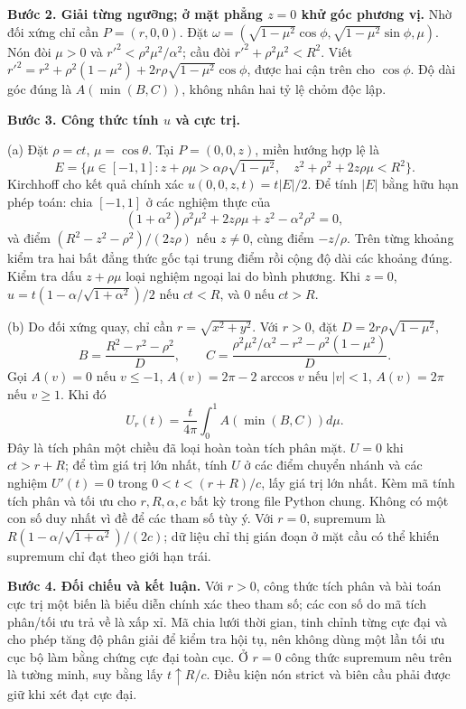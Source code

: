 \textbf{Bước 2. Giải từng ngưỡng; ở mặt phẳng $z=0$ khử góc phương vị.} Nhờ đối xứng chỉ cần $P=(r,0,0)$. Đặt $\omega=(\sqrt{1-\mu^2}\cos\phi,\sqrt{1-\mu^2}\sin\phi,\mu)$. Nón đòi $\mu>0$ và $r'^2<\rho^2\mu^2/\alpha^2$; cầu đòi $r'^2+\rho^2\mu^2<R^2$. Viết $r'^2=r^2+\rho^2(1-\mu^2)+2r\rho\sqrt{1-\mu^2}\cos\phi$, được hai cận trên cho $\cos\phi$. Độ dài góc đúng là $A(\min(B,C))$, không nhân hai tỷ lệ chỏm độc lập.

\textbf{Bước 3. Công thức tính $u$ và cực trị.}

(a) Đặt $\rho=ct$, $\mu=\cos\theta$. Tại $P=(0,0,z)$, miền hướng hợp lệ là
\[E=\{\mu\in[-1,1]:z+\rho\mu>\alpha\rho\sqrt{1-\mu^2},\quad z^2+\rho^2+2z\rho\mu<R^2\}.\]
Kirchhoff cho kết quả chính xác $u(0,0,z,t)=t|E|/2$. Để tính $|E|$ bằng hữu hạn phép toán: chia $[-1,1]$ ở các nghiệm thực của
\[(1+\alpha^2)\rho^2\mu^2+2z\rho\mu+z^2-\alpha^2\rho^2=0,\]
và điểm $(R^2-z^2-\rho^2)/(2z\rho)$ nếu $z\ne0$, cùng điểm $-z/\rho$. Trên từng khoảng kiểm tra hai bất đẳng thức gốc tại trung điểm rồi cộng độ dài các khoảng đúng. Kiểm tra dấu $z+\rho\mu$ loại nghiệm ngoại lai do bình phương. Khi $z=0$, $u=t(1-\alpha/\sqrt{1+\alpha^2})/2$ nếu $ct<R$, và 0 nếu $ct>R$.

(b) Do đối xứng quay, chỉ cần $r=\sqrt{x^2+y^2}$. Với $r>0$, đặt $D=2r\rho\sqrt{1-\mu^2}$,
\[B=\frac{R^2-r^2-\rho^2}{D},\qquad C=\frac{\rho^2\mu^2/\alpha^2-r^2-\rho^2(1-\mu^2)}D.\]
Gọi $A(v)=0$ nếu $v\le-1$, $A(v)=2\pi-2\arccos v$ nếu $|v|<1$, $A(v)=2\pi$ nếu $v\ge1$. Khi đó
\[U_r(t)=\frac t{4\pi}\int_0^1A(\min(B,C))d\mu.\]
Đây là tích phân một chiều đã loại hoàn toàn tích phân mặt. $U=0$ khi $ct>r+R$; để tìm giá trị lớn nhất, tính $U$ ở các điểm chuyển nhánh và các nghiệm $U'(t)=0$ trong $0<t<(r+R)/c$, lấy giá trị lớn nhất. Kèm mã tính tích phân và tối ưu cho $r,R,\alpha,c$ bất kỳ trong file Python chung. Không có một con số duy nhất vì đề để các tham số tùy ý. Với $r=0$, supremum là $R(1-\alpha/\sqrt{1+\alpha^2})/(2c)$; dữ liệu chỉ thị gián đoạn ở mặt cầu có thể khiến supremum chỉ đạt theo giới hạn trái.

\textbf{Bước 4. Đối chiếu và kết luận.} Với $r>0$, công thức tích phân và bài toán cực trị một biến là biểu diễn chính xác theo tham số; các con số do mã tích phân/tối ưu trả về là xấp xỉ. Mã chia lưới thời gian, tinh chỉnh từng cực đại và cho phép tăng độ phân giải để kiểm tra hội tụ, nên không dùng một lần tối ưu cục bộ làm bằng chứng cực đại toàn cục. Ở $r=0$ công thức supremum nêu trên là tường minh, suy bằng lấy $t\uparrow R/c$. Điều kiện nón strict và biên cầu phải được giữ khi xét đạt cực đại.

